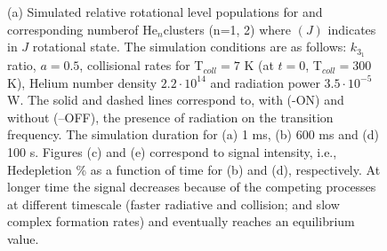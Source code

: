 \begin{figure}[!htb]
\begin{adjustbox}{minipage=\linewidth,scale=0.7}
    \hfill
    \hfill
    
    \end{adjustbox}
    
    \caption{
        (a) Simulated relative rotational level populations for
        \CD and corresponding numberof He$_n$\CD clusters (n=1, 2) 
        where \CD$(J)$ indicates \CD in $J$ rotational state. 
        The simulation conditions are as follows: $k_{3_1}$ ratio, $a=0.5$, 
        collisional rates for T$_{coll}=7$ K  (at $t=0$, T$_{coll}=300$ K), 
        Helium number density $2.2 \cdot 10^{14}$ \percc and radiation power $3.5\cdot10^{-5}$ W. 
        The solid and dashed lines correspond to, with (-ON) and without (--OFF), 
        the presence of radiation on the \CD \CDline transition frequency. 
        The simulation duration for (a) 1 ms, (b) 600 ms and (d) 100 s. 
        Figures (c) and (e) correspond to signal intensity, i.e., He\CD depletion \% as a 
        function of time for (b) and (d), respectively. 
        At longer time the signal decreases because of the competing processes at different timescale (faster radiative and collision; and slow complex formation rates) and eventually reaches an equilibrium value.
    }
    
    \label{fig:thz-sim:rel-pop}

\end{figure}
